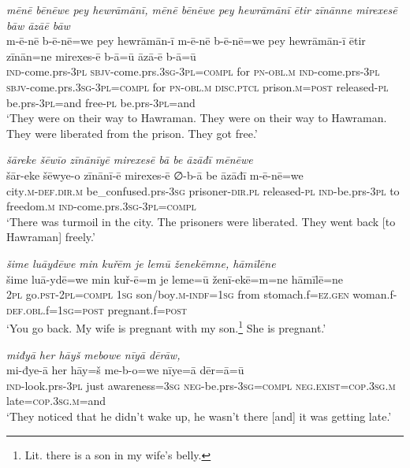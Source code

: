 \ea \label{BP.179}
\textit{mēnē bēnēwe pey hewrāmānī, mēnē bēnēwe pey hewrāmānī ētir zīnānne mirexesē bāw āzāē bāw} \\ 
\gll m-ē-nē b-ē-nē=we pey hewrāmān-ī m-ē-nē b-ē-nē=we pey hewrāmān-ī ētir zīnān=ne mirexes-ē b-ā=ū āzā-ē b-ā=ū \\ 
 \textsc{ind-}come.prs\textsc{-3pl} \textsc{sbjv-}come.prs\textsc{.3sg}\textsc{-3pl}\textsc{=compl} for \textsc{pn}\textsc{-obl}\textsc{.m} \textsc{ind-}come.prs\textsc{-3pl} \textsc{sbjv-}come.prs\textsc{.3sg}\textsc{-3pl}\textsc{=compl} for \textsc{pn}\textsc{-obl}\textsc{.m} \textsc{disc.ptcl} prison\textsc{.m}\textsc{=\textsc{post}} released\textsc{\textsc{-pl}} be.prs\textsc{-3pl}=and free\textsc{\textsc{-pl}} be.prs\textsc{-3pl}=and \\ 
\glt `They were on their way to Hawraman. They were on their way to Hawraman. They were liberated from the prison. They got free.'
\z 
 
\ea \label{BP.180}
\textit{šāreke šēwīo zīnānīyē mirexesē bā be āzāđī mēnēwe} \\ 
\gll šār-eke šēwye-o zīnānī-ē mirexes-ē ∅-b-ā be āzāđī m-ē-nē=we \\ 
 city\textsc{.m}\textsc{-def}\textsc{.dir}\textsc{.m} be\_confused.prs\textsc{-3sg} prisoner\textsc{-dir}\textsc{.pl} released\textsc{\textsc{-pl}} \textsc{ind-}be.prs\textsc{-3pl} to freedom\textsc{.m} \textsc{ind-}come.prs\textsc{.3sg}\textsc{-3pl}\textsc{=compl} \\ 
\glt `There was turmoil in the city. The prisoners were liberated. They went back [to Hawraman] freely.'
\z 
 
\ea \label{BP.185}
\textit{šime luāydēwe min kuřēm je lemū ženekēmne, hāmīlēne} \\ 
\gll šime luā-ydē=we min kuř-ē=m je leme=ū ženī-ekē=m=ne hāmīlē=ne \\ 
 \textsc{2pl} go\textsc{.pst}-\textsc{2pl}\textsc{=compl} \textsc{1sg} son/boy\textsc{.m}\textsc{-indf}\textsc{=\textsc{1sg}} from stomach.f\textsc{=ez.gen} woman.f\textsc{-def}\textsc{.obl}.f\textsc{=\textsc{1sg}}\textsc{=\textsc{post}} pregnant.f\textsc{=\textsc{post}} \\ 
\glt `You go back. My wife is pregnant with my son.\footnote{Lit. there is a son in my wife’s belly.} She is pregnant.'
\z 
 
\ea \label{BP.190}
\textit{miđyā her hāyš mebowe nīyā dērāw,} \\ 
\gll mi-đye-ā her hāy=š me-b-o=we nīye=ā dēr=ā=ū \\ 
 \textsc{ind-}look.prs\textsc{-3pl} just awareness\textsc{=3sg} \textsc{neg-}be.prs\textsc{-3sg}\textsc{=compl} \textsc{\textsc{neg.}exist}\textsc{=cop}\textsc{.3sg}\textsc{.m} late\textsc{=cop}\textsc{.3sg}\textsc{.m}=and \\ 
\glt `They noticed that he didn’t wake up, he wasn’t there [and] it was getting late.'
\z 
 
